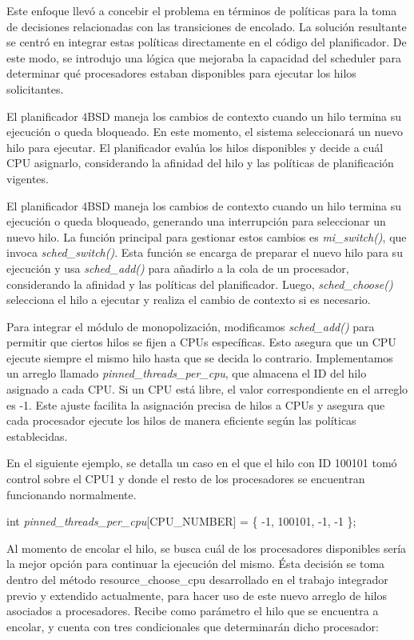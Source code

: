 Este enfoque llevó a concebir el problema en términos de políticas para la toma de decisiones relacionadas con las transiciones de encolado. La solución resultante se centró en integrar estas políticas directamente en el código del planificador. De este modo, se introdujo una lógica que mejoraba la capacidad del scheduler para determinar qué procesadores estaban disponibles para ejecutar los hilos solicitantes.


El planificador 4BSD maneja los cambios de contexto cuando un hilo termina su ejecución o queda bloqueado. En este momento, el sistema seleccionará un nuevo hilo para ejecutar. El planificador evalúa los hilos disponibles y decide a cuál CPU asignarlo, considerando la afinidad del hilo y las políticas de planificación vigentes.

El planificador 4BSD maneja los cambios de contexto cuando un hilo termina su ejecución o queda bloqueado, generando una interrupción para seleccionar un nuevo hilo. La función principal para gestionar estos cambios es \textit{mi\_switch()}, que invoca \textit{sched\_switch()}. Esta función se encarga de preparar el nuevo hilo para su ejecución y usa \textit{sched\_add()} para añadirlo a la cola de un procesador, considerando la afinidad y las políticas del planificador. Luego, \textit{sched\_choose()} selecciona el hilo a ejecutar y realiza el cambio de contexto si es necesario.

Para integrar el módulo de monopolización, modificamos \textit{sched\_add()} para permitir que ciertos hilos se fijen a CPUs específicas. Esto asegura que un CPU ejecute siempre el mismo hilo hasta que se decida lo contrario. Implementamos un arreglo llamado \textit{pinned\_threads\_per\_cpu}, que almacena el ID del hilo asignado a cada CPU. Si un CPU está libre, el valor correspondiente en el arreglo es -1. Este ajuste facilita la asignación precisa de hilos a CPUs y asegura que cada procesador ejecute los hilos de manera eficiente según las políticas establecidas.

En el siguiente ejemplo, se detalla un caso en el que el hilo con ID 100101 tomó control sobre el CPU1 y donde el resto de los procesadores se encuentran funcionando normalmente.

int \textit{pinned\_threads\_per\_cpu}[CPU\_NUMBER] = \{ -1, 100101, -1, -1 \};

Al momento de encolar el hilo, se busca cuál de los procesadores disponibles sería la mejor opción para continuar la ejecución del mismo. Ésta decisión se toma dentro del método resource\_choose\_cpu desarrollado en el trabajo integrador previo y extendido actualmente, para hacer uso de este nuevo arreglo de hilos asociados a procesadores. Recibe como parámetro el hilo que se encuentra a encolar, y cuenta con tres condicionales que determinarán dicho procesador:

